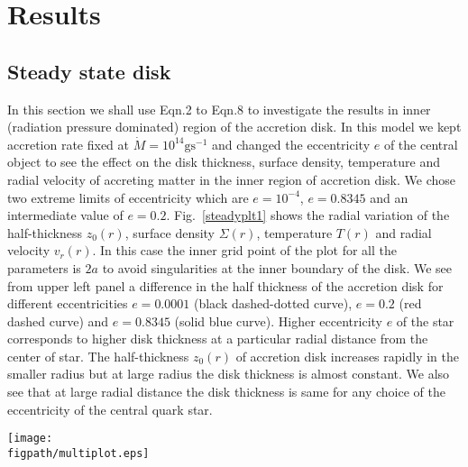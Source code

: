 \documentclass[useAMS,usenatbib]{mn2e}
\newcommand{\figpath}{./Figs/}
\begin{document}
\section{Results}
\subsection{Steady state disk}
In this section we shall use Eqn.2 to Eqn.8 to investigate the results in inner (radiation pressure dominated) region of the accretion disk. In this model we kept accretion rate fixed at $\dot{M} = 10^{14}\textrm{g}\textrm{s}^{-1}$ and changed the eccentricity $e$ of the central object to see the effect on the disk thickness, surface density, temperature and radial velocity of accreting matter in the inner region of accretion disk. We chose two extreme limits of eccentricity which are $e = 10^{-4}$, $e = 0.8345$ and an intermediate value of $e = 0.2$. Fig.~\ref{steadyplt1} shows the radial variation of the half-thickness $z_0(r)$, surface density $\Sigma(r)$, temperature $T(r)$ and radial velocity $v_r(r)$. In this case the inner grid point of the plot for all the parameters is $2a$ to avoid singularities at the inner boundary of the disk. We see from upper left panel a difference in the half thickness of the accretion disk for different eccentricities $e =0.0001$ (black dashed-dotted curve), $e = 0.2$ (red dashed curve) and $e = 0.8345$ (solid blue curve). Higher eccentricity $e$ of the star corresponds to higher disk thickness at a particular radial distance from the center of star. The half-thickness $z_0(r)$ of accretion disk increases rapidly in the smaller radius but at large radius the disk thickness is almost constant. We also see that at large radial distance the disk thickness is same for any choice of the eccentricity of the central quark star. 
\begin{figure*}
\centering
\texttt{[image: \\figpath/multiplot.eps]}
\caption{\small{Multiplot logarithmic radial variation of height $z_0(r)$, surface density $\Sigma(r)$, temperature $T(r)$ and radial velocity $v_r(r)$ variation with radial distance from the center of the star. The left upper panel shows the logarithmic radial variation of half-thickness $z_0(r)$ of the disk. The different chosen eccentricities are shown by $e = 0.0001$ (black dotted-dashed curve), $e = 0.2$ (red dashed curve) and $e = 0.8345$ (solid blue curve). This color convention for chosen eccentricities is same throughout the article. The right upper panel shows the logarithmic radial variation of the surface density $\Sigma(r)$. The left lower panel shows the logarithmic radial variation of the temperature $T(r)$. The lower right panel shows the logarithmic radial variation of the radial velocity $v_r(r)$ of the accreting matter.}}
\label{steadyplt1}
\end{figure*}
\end{document}
